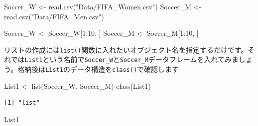 \documentclass[
  a4paper,
  pandoc,
  ja=standard,
  jafont=haranoaji]{bxjsbook}
\newenvironment{Shaded}{\begin{snugshade}}{\end{snugshade}}
\newcommand{\DecValTok}[1]{\textcolor[rgb]{0.68,0.00,0.00}{#1}}
\newcommand{\FunctionTok}[1]{\textcolor[rgb]{0.28,0.35,0.67}{#1}}
\newcommand{\NormalTok}[1]{\textcolor[rgb]{0.00,0.48,0.65}{#1}}
\newcommand{\OtherTok}[1]{\textcolor[rgb]{0.00,0.48,0.65}{#1}}
\newcommand{\SpecialCharTok}[1]{\textcolor[rgb]{0.37,0.37,0.37}{#1}}
\newcommand{\StringTok}[1]{\textcolor[rgb]{0.13,0.47,0.30}{#1}}
\begin{document}
\begin{Shaded}
\begin{Highlighting}[numbers=left,,]
\NormalTok{Soccer\_W }\OtherTok{\textless{}{-}} \FunctionTok{read.csv}\NormalTok{(}\StringTok{"Data/FIFA\_Women.csv"}\NormalTok{)}
\NormalTok{Soccer\_M }\OtherTok{\textless{}{-}} \FunctionTok{read.csv}\NormalTok{(}\StringTok{"Data/FIFA\_Men.csv"}\NormalTok{)}

\NormalTok{Soccer\_W }\OtherTok{\textless{}{-}}\NormalTok{ Soccer\_W[}\DecValTok{1}\SpecialCharTok{:}\DecValTok{10}\NormalTok{, ]}
\NormalTok{Soccer\_M }\OtherTok{\textless{}{-}}\NormalTok{ Soccer\_M[}\DecValTok{1}\SpecialCharTok{:}\DecValTok{10}\NormalTok{, ]}
\end{Highlighting}
\end{Shaded}

リストの作成には\texttt{list()}関数に入れたいオブジェクト名を指定するだけです。それでは\texttt{List1}という名前で\texttt{Soccer\_W}と\texttt{Soccer\_M}データフレームを入れてみましょう。格納後は\texttt{List1}のデータ構造を\texttt{class()}で確認します

\begin{Shaded}
\begin{Highlighting}[numbers=left,,]
\NormalTok{List1 }\OtherTok{\textless{}{-}} \FunctionTok{list}\NormalTok{(Soccer\_W, Soccer\_M)}
\FunctionTok{class}\NormalTok{(List1)}
\end{Highlighting}
\end{Shaded}

\begin{verbatim}
[1] "list"
\end{verbatim}

\begin{Shaded}
\begin{Highlighting}[numbers=left,,]
\NormalTok{List1}
\end{Highlighting}
\end{Shaded}
\end{document}
